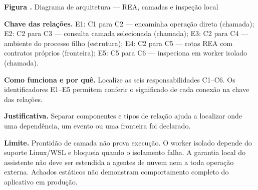 {\small\textbf{Figura \thefigure.} Diagrama de arquitetura --- REA, camadas e inspeção local}\par\smallskip
{\footnotesize\textbf{Chave das relações.} E1: C1 para C2 --- encaminha operação direta (chamada); E2: C2 para C3 --- consulta camada selecionada (chamada); E3: C2 para C4 --- ambiente do processo filho (estrutura); E4: C2 para C5 --- rotas REA com contratos próprios (fronteira); E5: C5 para C6 --- inspeciona em worker isolado (chamada).}\par\smallskip
\noindent\textbf{Como funciona e por quê.} Localize as seis responsabilidades C1--C6. Os identificadores E1--E5 permitem conferir o significado de cada conexão na chave das relações.\par
\noindent\textbf{Justificativa.} Separar componentes e tipos de relação ajuda a localizar onde uma dependência, um evento ou uma fronteira foi declarado.\par
\noindent\textbf{Limite.} Prontidão de camada não prova execução. O worker isolado depende do suporte Linux/WSL e bloqueia quando o isolamento falha. A garantia local do assistente não deve ser estendida a agentes de nuvem nem a toda operação externa. Achados estáticos não demonstram comportamento completo do aplicativo em produção.\par\smallskip
{}
